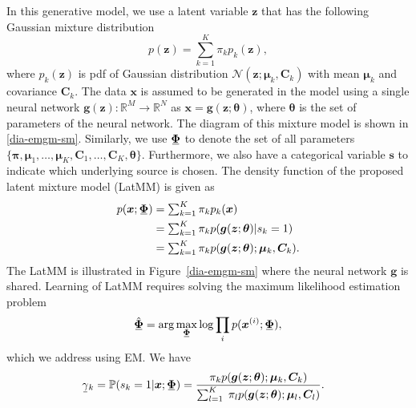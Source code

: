In this generative model, we use a latent variable $\bm{z}$ that has the following Gaussian mixture distribution
\begin{equation}
  p(\bm{z}) = \sum_{k=1}^K \pi_k p_k(\bm{z}), %
\end{equation}
where $p_k(\bm{z})$ is pdf of Gaussian distribution $\mathcal{N}(\bm{z};\bm{\mu}_k,\bm{C}_k)$ with mean $\bm{\mu}_k$ and covariance $\bm{C}_k$.
The data $\bm{x}$ is
assumed to be generated in the model using a single neural network
$\bm{g}(\bm{z}): \mathbb{R}^M \rightarrow \mathbb{R}^N$ as
$\bm{x}=\bm{g}(\bm{z};\bm{\theta})$, where $\bm{\theta}$
is the set of parameters of the neural network. The diagram of this mixture model
is shown in \autoref{dia-emgm-sm}. Similarly, we use $\ubar{\bm{\Phi}}$ to denote the set of all parameters $\{ \bm{\pi},
\bm{\mu}_1,\hdots, \bm{\mu}_K, \bm{C}_1,\hdots,
\bm{C}_K, \bm{\theta} \}$. Furthermore, we also have a categorical variable $\bm{s}$ to indicate which underlying source is chosen. The density function of the proposed latent mixture model (LatMM) is given as
\begin{align}\label{eq:SecondMixtureModel}
  p(\bm{x};\ubar{\bm{\Phi}}) & = \textstyle\sum_{k=1}^K \pi_k p_k(\bm{x}) \nonumber\\
                             &= \textstyle\sum_{k=1}^K \pi_k  p(\bm{g}(\bm{z}; \bm{\theta})| s_k=1) \nonumber \\
                             & = \textstyle\sum_{k=1}^K \pi_k  p(\bm{g}(\bm{z};\bm{\theta}); \bm{\mu}_k, \bm{C}_k).
\end{align}
The LatMM is illustrated in Figure~\ref{dia-emgm-sm} where the neural network $\bm{g}$ is shared. Learning of LatMM requires solving the maximum likelihood estimation problem
\begin{equation}
  \ubar{\hat{\bm{\Phi}}} =    \arg \max_{\ubar{\bm{\Phi}}} \log \prod_{i} p(\bm{x}^{(i)};\ubar{\bm{\Phi}}),
\end{equation}
which we address using EM.
We have
\begin{align}\label{eq-latMM-gamma}
  \hspace{-9pt}\ubar{\gamma}_k = \PP(s_k =1|\bm{x};\ubar{\bm{\Phi}})  
  = \frac{\pi_k p(\bm{g}(\bm{z};\bm{\theta});\bm{\mu}_k, \bm{C}_k)}{\sum_{l=1}^K\; \pi_l p(\bm{g}(\bm{z};\bm{\theta});\bm{\mu}_l, \bm{C}_l)}.
\end{align}


